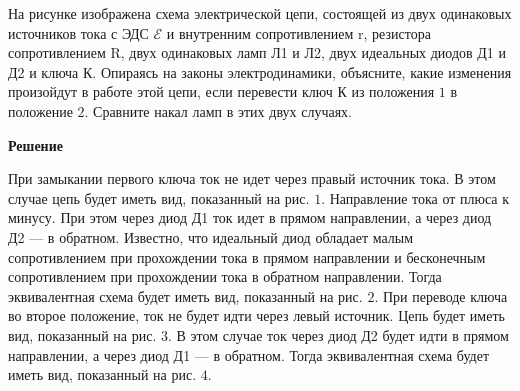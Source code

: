 \documentclass[12pt,a4paper]{article}
\begin{document}
{На рисунке изображена схема электрической цепи, состоящей из двух одинаковых источников тока с ЭДС $\mathcal{E}$ и внутренним сопротивлением r, резистора сопротивлением R, двух одинаковых ламп Л1 и Л2, двух идеальных диодов Д1 и Д2 и ключа К. Опираясь на законы электродинамики, объясните, какие изменения произойдут в работе этой цепи, если перевести ключ К из положения $1$ в положение $2$. Сравните накал ламп в этих двух случаях.
}{
\smallskip\noindent\textbf{Решение}\par
При замыкании первого ключа ток не идет через правый источник тока. В этом случае цепь будет иметь вид, показанный на рис. $1$. Направление тока от плюса к минусу. При этом через диод Д1 ток идет в прямом направлении, а через диод Д2  — в обратном. Известно, что идеальный диод обладает малым сопротивлением при прохождении тока в прямом направлении и бесконечным сопротивлением при прохождении тока в обратном направлении. Тогда эквивалентная схема будет иметь вид, показанный на рис. $2$. 
При переводе ключа во второе положение, ток не будет идти через левый источник. Цепь будет иметь вид, показанный на рис. $3$. В этом случае ток через диод Д2 будет идти в прямом направлении, а через диод Д1  — в обратном. Тогда эквивалентная схема будет иметь вид, показанный на рис. $4$. 


\begin{center}\begin{tikzpicture}[>=stealth,line width=.6pt]


\end{tikzpicture}
\end{center}}
\end{document}
